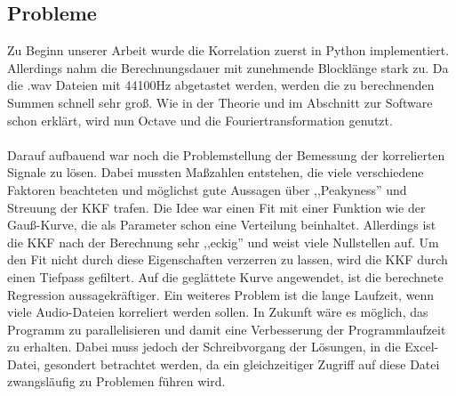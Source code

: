 \subsection{Probleme} 
Zu Beginn unserer Arbeit wurde die Korrelation zuerst in Python implementiert. Allerdings nahm die Berechnungsdauer mit zunehmende Blocklänge stark zu. Da die .wav Dateien mit 44100Hz abgetastet werden, werden die zu berechnenden Summen schnell sehr groß. Wie in der Theorie und im Abschnitt zur Software schon erklärt, wird nun Octave und die Fouriertransformation genutzt. \\\\Darauf aufbauend war noch die Problemstellung der Bemessung der korrelierten Signale zu lösen. Dabei mussten Maßzahlen entstehen, die viele verschiedene Faktoren beachteten und möglichst gute Aussagen über ,,Peakyness'' und Streuung der KKF trafen. Die Idee war einen Fit mit einer Funktion wie der Gauß-Kurve, die als Parameter schon eine Verteilung beinhaltet. Allerdings ist die KKF nach der Berechnung sehr ,,eckig'' und weist viele Nullstellen auf. Um den Fit nicht durch diese Eigenschaften verzerren zu lassen, wird die KKF durch einen Tiefpass gefiltert. Auf die geglättete Kurve angewendet, ist die berechnete Regression aussagekräftiger.
Ein weiteres Problem ist die lange Laufzeit, wenn viele Audio-Dateien korreliert werden sollen. In Zukunft wäre es möglich, das Programm zu parallelisieren und damit eine Verbesserung der Programmlaufzeit zu erhalten. Dabei muss jedoch der Schreibvorgang der Lösungen, in die Excel-Datei, gesondert betrachtet werden, da ein gleichzeitiger Zugriff auf diese Datei zwangsläufig zu Problemen führen wird.
